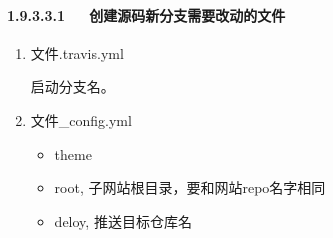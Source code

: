 \documentclass[letterpaper,12pt,english]{sphinxmanual}
\begin{document}
\paragraph{1.9.3.3.1   创建源码新分支需要改动的文件}
\label{\detokenize{001software/001install/001._u7f51_u7ad9/hexo:id25}}\begin{enumerate}
%
\item {} 
文件.travis.yml

启动分支名。

\begin{sphinxVerbatim}[commandchars=\\\{\}]
     
\end{sphinxVerbatim}

\item {} 
文件\_config.yml
\begin{itemize}
\item {} 
theme

\begin{sphinxVerbatim}[commandchars=\\\{\}]
 
\end{sphinxVerbatim}

\item {} 
root, 子网站根目录，要和网站repo名字相同

\begin{sphinxVerbatim}[commandchars=\\\{\}]
 
\end{sphinxVerbatim}

\item {} 
deloy, 推送目标仓库名

\begin{sphinxVerbatim}[commandchars=\\\{\}]
   
   
   
\end{sphinxVerbatim}


\end{itemize}
\end{enumerate}
\end{document}
